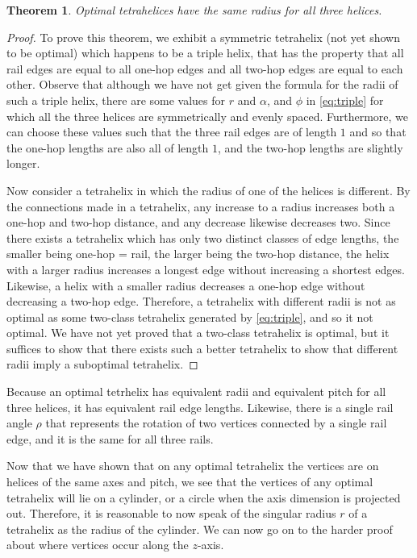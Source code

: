 \documentclass[twocolumn,10pt]{asme2ej}
\newtheorem{theorem}{Theorem}
\begin{document}
\begin{theorem}
  Optimal tetrahelices have the same radius for all three helices.
\end{theorem}
\begin{proof}
To prove this theorem, we exhibit a symmetric tetrahelix (not yet shown to be optimal) which
happens to be a triple helix, that has
the property that all rail edges are equal to all one-hop edges and all two-hop
edges are equal to each other. 
Observe that although we have not get given the formula for the
radii of such a triple helix, there are some values for $r$ and $\alpha$, and $\phi$
in \cref{eq:triple}
for which all the three helices are symmetrically and evenly spaced. Furthermore,
we can choose these values such that the three rail edges are of length $1$ and
so that the one-hop lengths are also all of length $1$, and the two-hop lengths
are slightly longer.

Now consider a tetrahelix in which the radius of one of the helices is different.
By the connections made in a tetrahelix, any increase to a radius increases both
a one-hop and two-hop distance, and any decrease likewise decreases two.
Since there exists a tetrahelix which has only two distinct classes of edge lengths,
the smaller being one-hop = rail, the larger being the two-hop distance, the helix
with a larger radius increases a longest edge without increasing a shortest edges.
Likewise, a helix with a smaller radius decreases a one-hop edge without decreasing
a two-hop edge.  Therefore, a tetrahelix with different radii is not as optimal as some two-class 
tetrahelix generated by \cref{eq:triple}, and so it not optimal. We have not yet
proved that a two-class tetrahelix is optimal, but it suffices to show that there
exists such a better tetrahelix to show that different radii imply a suboptimal
tetrahelix.
\end{proof}

Because an optimal tetrhelix has equivalent radii and equivalent pitch for all three helices,
it has equivalent rail edge lengths. Likewise, there is a single rail angle $\rho$ that
represents the rotation of two vertices connected by a single rail edge, and it is the same
for all three rails.

Now that we have shown that on any optimal tetrahelix the vertices
are on helices of the same axes and pitch, we see that the vertices 
of any optimal tetrahelix will lie on a cylinder, or a circle when the axis dimension
is projected out. Therefore, it is reasonable to now speak of the singular radius $r$
of a tetrahelix as the radius of the cylinder.
We can now go on to
the harder proof about where vertices occur along the $z$-axis.
\end{document}
